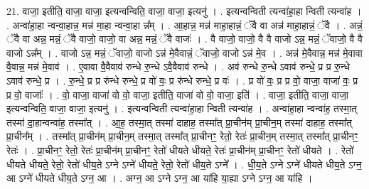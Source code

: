 \documentclass[17pt]{extarticle}
\begin{document}
21. वाजा॒ इतीति॒ वाजा॒ वाजा॒ इत्यन्वन्विति॒ वाजा॒ वाजा॒ इत्यनु॑ । . इत्यन्वन्विती त्यन्वा॑हा॒हा न्विती त्यन्वा॑ह । . अन्वा॑हा॒हा न्वन्वा॒हान्न॒ मन्न॑ मा॒हा न्वन्वा॒हा न्न᳚म् । . आ॒हान्न॒ मन्न॑ माहा॒हान्नं॒ ॅवै वा अन्न॑ माहा॒हान्नं॒ ॅवै । . अन्नं॒ ॅवै वा अन्न॒ मन्नं॒ ॅवै वाजो॒ वाजो॒ वा अन्न॒ मन्नं॒ ॅवै वाजः॑ । . वै वाजो॒ वाजो॒ वै वै वाजो ऽन्न॒ मन्नं॒ ॅवाजो॒ वै वै वाजो ऽन्न᳚म् । . वाजो ऽन्न॒ मन्नं॒ ॅवाजो॒ वाजो ऽन्न॑ मे॒वैवान्नं॒ ॅवाजो॒ वाजो ऽन्न॑ मे॒व । . अन्न॑ मे॒वैवान्न॒ मन्न॑ मे॒वावा वै॒वान्न॒ मन्न॑ मे॒वाव॑ । . ए॒वावा वै॒वैवाव॑ रुन्धे रु॒न्धे ऽवै॒वैवाव॑ रुन्धे । . अव॑ रुन्धे रु॒न्धे ऽवाव॑ रुन्धे॒ प्र प्र रु॒न्धे ऽवाव॑ रुन्धे॒ प्र । . रु॒न्धे॒ प्र प्र रु॑न्धे रुन्धे॒ प्र वो॑ वः॒ प्र रु॑न्धे रुन्धे॒ प्र वः॑ । . प्र वो॑ वः॒ प्र प्र वो॒ वाजा॒ वाजा॑ वः॒ प्र प्र वो॒ वाजाः᳚ । . वो॒ वाजा॒ वाजा॑ वो वो॒ वाजा॒ इतीति॒ वाजा॑ वो वो॒ वाजा॒ इति॑ । . वाजा॒ इतीति॒ वाजा॒ वाजा॒ इत्यन्वन्विति॒ वाजा॒ वाजा॒ इत्यनु॑ । . इत्यन्वन्विती त्यन्वा॑हा॒हा न्विती त्यन्वा॑ह । . अन्वा॑हा॒हा न्वन्वा॑ह॒ तस्मा॒त् तस्मा॑ दा॒हान्वन्वा॑ह॒ तस्मा᳚त् । . आ॒ह॒ तस्मा॒त् तस्मा॑ दाहाह॒ तस्मा᳚त् प्रा॒चीन॑म् प्रा॒चीन॒म् तस्मा॑ दाहाह॒ तस्मा᳚त् प्रा॒चीन᳚म् । . तस्मा᳚त् प्रा॒चीन॑म् प्रा॒चीन॒म् तस्मा॒त् तस्मा᳚त् प्रा॒चीनꣳ॒॒ रेतो॒ रेतः॑ प्रा॒चीन॒म् तस्मा॒त् तस्मा᳚त् प्रा॒चीनꣳ॒॒ रेतः॑ । . प्रा॒चीनꣳ॒॒ रेतो॒ रेतः॑ प्रा॒चीन॑म् प्रा॒चीनꣳ॒॒ रेतो॑ धीयते धीयते॒ रेतः॑ प्रा॒चीन॑म् प्रा॒चीनꣳ॒॒ रेतो॑ धीयते । . रेतो॑ धीयते धीयते॒ रेतो॒ रेतो॑ धीय॒ते ऽग्ने ऽग्ने॑ धीयते॒ रेतो॒ रेतो॑ धीय॒ते ऽग्ने᳚ । . धी॒य॒ते ऽग्ने ऽग्ने॑ धीयते धीय॒ते ऽग्न॒ आ ऽग्ने॑ धीयते धीय॒ते ऽग्न॒ आ । . अग्न॒ आ ऽग्ने ऽग्न॒ आ या॑हि या॒ह्या ऽग्ने ऽग्न॒ आ या॑हि । \newline
\end{document}
